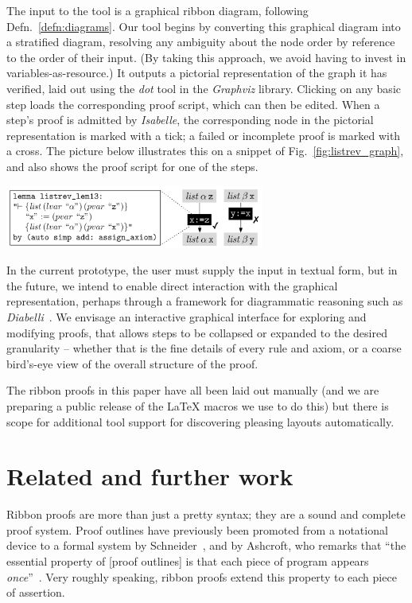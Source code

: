 \documentclass[runningheads,a4paper]{llncs}
\begin{document}
The input to the tool is a graphical ribbon diagram, following Defn.~\ref{defn:diagrams}. Our tool begins by converting this graphical diagram into a stratified diagram, resolving any ambiguity about the node order by reference to the order of their input. (By taking this approach, we avoid having to invest in variables-as-resource.) It outputs a pictorial representation of the graph it has verified, laid out using the \emph{dot} tool in the \emph{Graphviz} library. Clicking on any basic step loads the corresponding proof script, which can then be edited. When a step's proof is admitted by \emph{Isabelle}, the corresponding node in the pictorial representation is marked with a tick; a failed or incomplete proof is marked with a cross. The picture below illustrates this on a snippet of Fig.~\ref{fig:listrev_graph}, and also shows the proof script for one of the steps.
\begin{center}
\includegraphics[width=85mm]{listrev_graph_mini.pdf}
\end{center}
In the current prototype, the user must supply the input in textual form, but in the future, we intend to enable direct interaction with the graphical representation, perhaps through a framework for diagrammatic reasoning such as \emph{Diabelli}~\cite{urbas+12}. We envisage an interactive graphical interface for exploring and modifying proofs, that allows steps to be collapsed or expanded to the desired granularity -- whether that is the fine details of every rule and axiom, or a coarse bird's-eye view of the overall structure of the proof.

The ribbon proofs in this paper have all been laid out manually (and we are preparing a public release of the {\LaTeX} macros we use to do this) but there is scope for additional tool support for discovering pleasing layouts automatically.

\section{Related and further work}\label{sect:future}

Ribbon proofs are more than just a pretty syntax; they are a sound and complete proof system. Proof outlines have previously been promoted from a notational device to a formal system by Schneider~\cite{schneider97}, and by Ashcroft, who remarks that ``the essential property of [proof outlines] is that each piece of program appears \emph{once}''~\cite{ashcroft76}. Very roughly speaking, ribbon proofs extend this property to each piece of assertion.
\end{document}
